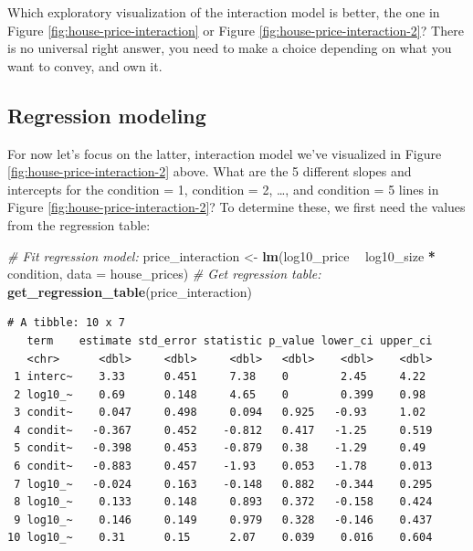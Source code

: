 \documentclass[12pt, krantz2,]{krantz}
\makeatletter
\newenvironment{Shaded}{\begin{snugshade}}{\end{snugshade}}
\newcommand{\CommentTok}[1]{\textcolor[rgb]{0.37,0.37,0.37}{\textit{#1}}}
\newcommand{\DataTypeTok}[1]{\textcolor[rgb]{0.27,0.27,0.27}{#1}}
\newcommand{\KeywordTok}[1]{\textcolor[rgb]{0.27,0.27,0.27}{\textbf{#1}}}
\newcommand{\NormalTok}[1]{#1}
\newcommand{\OperatorTok}[1]{\textcolor[rgb]{0.43,0.43,0.43}{\textbf{#1}}}
\newcommand{\StringTok}[1]{\textcolor[rgb]{0.5,0.5,0.5}{#1}}
\newenvironment{kframe}{%
\medskip{}
\setlength{\fboxsep}{.8em}
 \def\at@end@of@kframe{}%
 \ifinner\ifhmode%
  \def\at@end@of@kframe{\end{minipage}}%
  \begin{minipage}{\columnwidth}%
 \fi\fi%
 \def\FrameCommand##1{\hskip\@totalleftmargin \hskip-\fboxsep
 \colorbox{shadecolor}{##1}\hskip-\fboxsep
     \hskip-\linewidth \hskip-\@totalleftmargin \hskip\columnwidth}%
 \MakeFramed {\advance\hsize-\width
   \@totalleftmargin\z@ \linewidth\hsize
   \@setminipage}}%
 {\par\unskip\endMakeFramed%
 \at@end@of@kframe}
\renewenvironment{Shaded}{\begin{kframe}}{\end{kframe}}
\makeatother
\begin{document}
Which exploratory visualization of the interaction model is better, the one in Figure \ref{fig:house-price-interaction} or Figure \ref{fig:house-price-interaction-2}? There is no universal right answer, you need to make a choice depending on what you want to convey, and own it.

\hypertarget{house-prices-regression}{%
\subsection{Regression modeling}\label{house-prices-regression}}

For now let's focus on the latter, interaction model we've visualized in Figure \ref{fig:house-price-interaction-2} above. What are the 5 different slopes and intercepts for the condition = 1, condition = 2, \ldots{}, and condition = 5 lines in Figure \ref{fig:house-price-interaction-2}? To determine these, we first need the values from the regression table:

\begin{Shaded}
\begin{Highlighting}[]
\CommentTok{# Fit regression model:}
\NormalTok{price_interaction <-}\StringTok{ }\KeywordTok{lm}\NormalTok{(log10_price }\OperatorTok{~}\StringTok{ }\NormalTok{log10_size }\OperatorTok{*}\StringTok{ }\NormalTok{condition, }\DataTypeTok{data =}\NormalTok{ house_prices)}
\CommentTok{# Get regression table:}
\KeywordTok{get_regression_table}\NormalTok{(price_interaction)}
\end{Highlighting}
\end{Shaded}

\begin{verbatim}
# A tibble: 10 x 7
   term    estimate std_error statistic p_value lower_ci upper_ci
   <chr>      <dbl>     <dbl>     <dbl>   <dbl>    <dbl>    <dbl>
 1 interc~    3.33      0.451     7.38    0        2.45     4.22 
 2 log10_~    0.69      0.148     4.65    0        0.399    0.98 
 3 condit~    0.047     0.498     0.094   0.925   -0.93     1.02 
 4 condit~   -0.367     0.452    -0.812   0.417   -1.25     0.519
 5 condit~   -0.398     0.453    -0.879   0.38    -1.29     0.49 
 6 condit~   -0.883     0.457    -1.93    0.053   -1.78     0.013
 7 log10_~   -0.024     0.163    -0.148   0.882   -0.344    0.295
 8 log10_~    0.133     0.148     0.893   0.372   -0.158    0.424
 9 log10_~    0.146     0.149     0.979   0.328   -0.146    0.437
10 log10_~    0.31      0.15      2.07    0.039    0.016    0.604
\end{verbatim}
\end{document}
